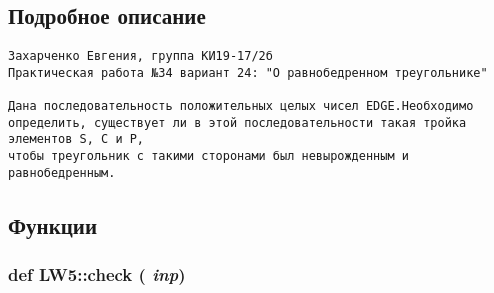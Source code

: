 \subsection{Подробное описание}


\footnotesize\begin{verbatim}
Захарченко Евгения, группа КИ19-17/2б
Практическая работа №34 вариант 24: "О равнобедренном треугольнике"

Дана последовательность положительных целых чисел EDGE.Необходимо
определить, существует ли в этой последовательности такая тройка элементов S, C и P,
чтобы треугольник с такими сторонами был невырожденным и равнобедренным.
\end{verbatim}
\normalsize
 



\subsection{Функции}
\hypertarget{namespace_l_w5_88a5f4487738d82cba5b3ac7c6a09282}{
\subsubsection[{check}]{\setlength{\rightskip}{0pt plus 5cm}def LW5::check ( {\em inp})}}
\label{namespace_l_w5_88a5f4487738d82cba5b3ac7c6a09282}




